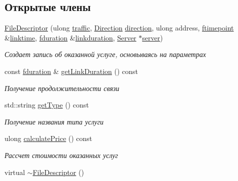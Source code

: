 \subsection*{Открытые члены}
\begin{DoxyCompactItemize}
\item 
\hyperlink{class_network_service_1_1_file_descriptor_a87c067c9340ac785ff7fb7a012ea8bba}{File\+Descriptor} (ulong \hyperlink{class_network_service_1_1_post_descriptor_ae2eef559828a42ec299ab59711f88e59}{traffic}, \hyperlink{namespace_network_service_abe1196dad9e8afcbc5c6b38196ce2c65}{Direction} \hyperlink{class_network_service_1_1_post_descriptor_a04faf66e747b2d4f2d89bf1e92f4ab5c}{direction}, ulong address, \hyperlink{networkservice_8h_ac877dfabb0f4f6a8184aa821b447e81d}{ftimepoint} \&\hyperlink{class_network_service_1_1_service_descriptor_a08bfd17afce0cba1954d30bd76a14df4}{linktime}, \hyperlink{networkservice_8h_a476cc728ef971cba9111c75ea41a760a}{fduration} \&\hyperlink{class_network_service_1_1_file_descriptor_a1ce56aef66c93f0a6a5eebc8d43c4bb8}{linkduration}, \hyperlink{class_network_service_1_1_server}{Server} $\ast$\hyperlink{class_network_service_1_1_service_descriptor_ad504b32ced44a75e0e02ea961d9434c4}{server})
\begin{DoxyCompactList}\small\item\em Создает запись об оказанной услуге, основываясь на параметрах \end{DoxyCompactList}\item 
const \hyperlink{networkservice_8h_a476cc728ef971cba9111c75ea41a760a}{fduration} \& \hyperlink{class_network_service_1_1_file_descriptor_ae77011c643f4d7889a417e6fc91a3c72}{get\+Link\+Duration} () const 
\begin{DoxyCompactList}\small\item\em Получение продолжительности связи \end{DoxyCompactList}\item 
std\+::string \hyperlink{class_network_service_1_1_file_descriptor_a68270f753630bf3ac34c621a56e4f6f7}{get\+Type} () const 
\begin{DoxyCompactList}\small\item\em Получение названия типа услуги \end{DoxyCompactList}\item 
ulong \hyperlink{class_network_service_1_1_file_descriptor_a2c480da1613f7072d3113082d1f8cc54}{calculate\+Price} () const 
\begin{DoxyCompactList}\small\item\em Рассчет стоимости оказанных услуг \end{DoxyCompactList}\item 
virtual \hyperlink{class_network_service_1_1_file_descriptor_a272dfe09943e106eaf103218fc5ee8d7}{$\sim$\+File\+Descriptor} ()
\end{DoxyCompactItemize}
